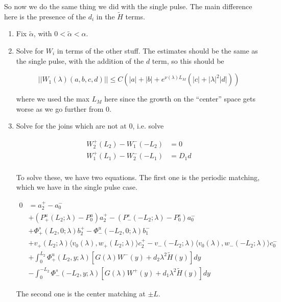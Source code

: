 \documentclass[12pt]{article}
\begin{document}
So now we do the same thing we did with the single pulse. The main difference here is the presence of the $d_i$ in the $\tilde{H}$ terms. 

\begin{enumerate}

\item Fix $\tilde{\alpha}$, with $0 < \tilde{\alpha} < \alpha$. 

\item Solve for $W_i$ in terms of the other stuff. The estimates should be the same as the single pulse, with the addition of the $d$ term, so this should be

\[
||W_1(\lambda)(a,b,c,d)|| \leq C (|a| + |b| + e^{\nu(\lambda)L_M}(|c| + |\lambda|^2 |d| ))
\]

where we used the max $L_M$ here since the growth on the ``center'' space gets worse as we go further from 0.

\item Solve for the joins which are not at 0, i.e. solve

\begin{align*}
W_2^+(L_2) - W_1^-(-L_2) &= 0 \\
W_1^+(L_1) - W_2^-(-L_1) &= D_1 d \\
\end{align*}

To solve these, we have two equations. The first one is the periodic matching, which we have in the single pulse case.

\begin{align*}
0 &= a_2^+ - a_0^- \\
&+ (P^u_+(L_2; \lambda) - P_0^u)a_2^+ - (P^s_-(-L_2; \lambda) - P_0^s)a_0^- \\
&+ \Phi^s_+(L_2, 0; \lambda)b_2^+ - \Phi^u_-(-L_2, 0; \lambda)b_1^- \\
&+ v_+(L_2; \lambda) \langle v_0(\lambda), w_+(L_2; \lambda) \rangle c_2^+ - v_-(-L_2; \lambda) \langle v_0(\lambda), w_-(-L_2; \lambda) \rangle c_0^- \\
&+ \int_0^{L_2} \Phi^u_+(L_2, y; \lambda) [ G(\lambda)W^-(y) + d_2 \lambda^2 \tilde{H}(y) ] dy \\
&- \int_0^{-L_2} \Phi^s_-(-L_2, y; \lambda) [ G(\lambda)W^+(y) + d_1 \lambda^2 \tilde{H}(y) ] dy
\end{align*}

The second one is the center matching at $\pm L$.


\end{enumerate}
\end{document}
